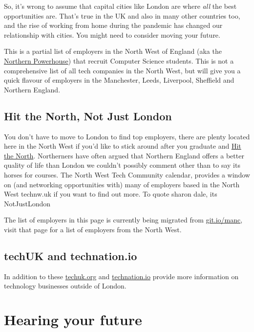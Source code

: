 \documentclass[
]{book}
\begin{document}
So, it's wrong to assume that capital cities like London are where \emph{all} the best opportunities are. That's true in the UK and also in many other countries too, and the rise of working from home during the pandemic has changed our relationship with cities. You might need to consider moving your future.

This is a partial list of employers in the North West of England (aka the \href{https://en.wikipedia.org/wiki/Northern_Powerhouse}{Northern Powerhouse}) that recruit Computer Science students. This is not a comprehensive list of all tech companies in the North West, but will give you a quick flavour of employers in the Manchester, Leeds, Liverpool, Sheffield and Northern England.

\hypertarget{hit-the-north-not-just-london}{%
\section{Hit the North, Not Just London}\label{hit-the-north-not-just-london}}

You don't have to move to London to find top employers, there are plenty located here in the North West if you'd like to stick around after you graduate and \href{https://en.wikipedia.org/wiki/Hit_the_North}{Hit the North}. \citep{hitthenorth} Northerners have often argued that Northern England offers a better quality of life than London we couldn't possibly comment other than to say its horses for courses. The North West Tech Community calendar, provides a window on (and networking opportunities with) many of employers based in the North West technw.uk if you want to find out more. To quote sharon dale, its NotJustLondon \citep{notjustlondon}

The list of employers in this page is currently being migrated from \href{https://git.io/manc}{git.io/manc}, visit that page for a list of employers from the North West.

\hypertarget{techuk-and-technation.io}{%
\section{techUK and technation.io}\label{techuk-and-technation.io}}

In addition to these \href{https://www.techuk.org}{techuk.org} and \href{https://technation.io}{technation.io} provide more information on technology businesses outside of London.

\hypertarget{hearing}{%
\chapter{Hearing your future}\label{hearing}}
\end{document}
